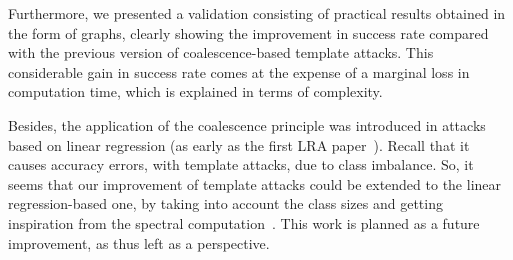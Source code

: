 \documentclass[conference,twocolumn]{IEEEtran}
\begin{document}
Furthermore, we presented a validation consisting of practical results obtained in the form of graphs, clearly showing the improvement in success rate compared with the previous version of coalescence-based template attacks. 
This considerable gain in success rate comes at the expense of a marginal loss in computation time, which is explained in terms of complexity.

Besides, the application of the coalescence principle was introduced in attacks based on linear regression (as early as the first LRA paper~\cite{DBLP:conf/pkc/Schindler05}). 
Recall that it causes accuracy errors, with template attacks, due to class imbalance.
So, it seems that our improvement of template attacks could be extended to the linear regression-based one, by taking into account the class sizes and getting inspiration from the spectral computation~\cite{DBLP:conf/cosade/OULADJ2020}. 
This work is planned as a future improvement, as thus left as a perspective.




\end{document}

